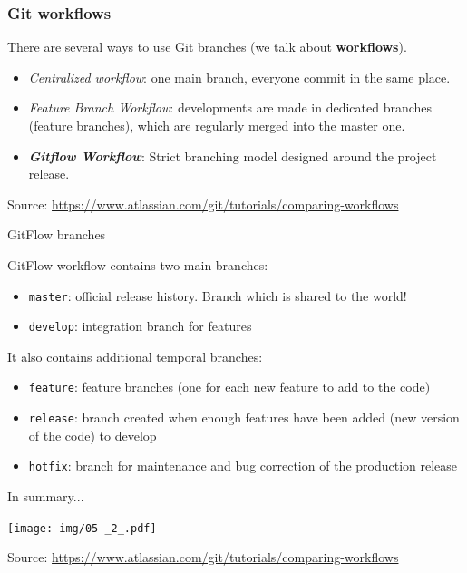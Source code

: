 \documentclass[svgnames]{beamer}
\begin{document}
\begin{frame}
    \frametitle{Git workflows} %
    There are several ways to use Git branches (we talk about \textbf{workflows}). 

    \begin{itemize}
        \item \emph{Centralized workflow}: one main branch, everyone commit in the same place.
        \item \emph{Feature Branch Workflow}: developments are made in dedicated branches (feature branches), which are regularly merged into the master one.
        \item \textbf{\textit{Gitflow Workflow}}: Strict branching model designed around the project release.
    \end{itemize}

    \tiny Source: \url{https://www.atlassian.com/git/tutorials/comparing-workflows}

\end{frame}

\begin{frame}[fragile]{GitFlow branches}

    GitFlow workflow contains two main branches:
    \begin{itemize}
        \item{\verb+master+: official release history. Branch which is shared to the world!}
        \item{\verb+develop+: integration branch for features}
    \end{itemize}

    It also contains additional temporal branches:
    \begin{itemize}
        \item{\verb+feature+: feature branches (one for each new feature to add to the code)}
        \item{\verb+release+: branch created when enough features have been added (new version of the code) to develop}
        \item{\verb+hotfix+: branch for maintenance and bug correction of the production release}
    \end{itemize}

\end{frame}

\begin{frame}{In summary...}

    \begin{center}
        \texttt{[image: img/05-\_2\_.pdf]}    
    \end{center}
    
    \tiny Source: \url{https://www.atlassian.com/git/tutorials/comparing-workflows}

\end{frame}    
\end{document}

